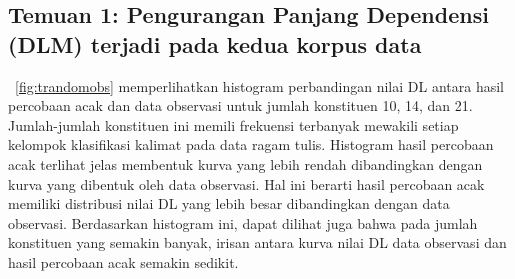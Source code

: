 \subsection{Temuan 1: Pengurangan Panjang Dependensi (DLM) terjadi pada kedua korpus data}
\pic~\ref{fig:trandomobs} memperlihatkan histogram perbandingan nilai DL antara hasil percobaan acak dan data observasi untuk jumlah konstituen 10, 14, dan 21. Jumlah-jumlah konstituen ini memili frekuensi terbanyak mewakili setiap kelompok klasifikasi kalimat pada data ragam tulis.  Histogram hasil percobaan acak terlihat jelas membentuk kurva yang lebih rendah dibandingkan dengan kurva yang dibentuk oleh data observasi. Hal ini berarti hasil percobaan acak memiliki distribusi nilai DL yang lebih besar dibandingkan dengan data observasi. Berdasarkan histogram ini, dapat dilihat juga bahwa pada jumlah konstituen yang semakin banyak, irisan antara kurva nilai DL data observasi dan hasil percobaan acak semakin sedikit.

